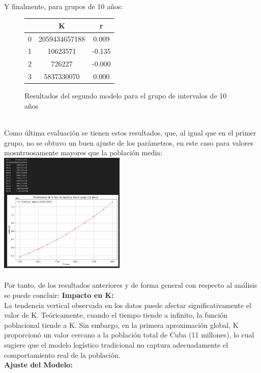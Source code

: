 \documentclass[a4paper,10pt,twocolumn]{article}
\begin{document}
\\
Y finalmente, para grupos de 10 años:\\
\begin{figure}[h!]%
	\begin{center}
		\begin{tabular}{|c|c|c|} \hline
					 & K 			& r 		\\ \hline
			0		 & 2059434657188& 0.009		\\ \hline
			1		 &10623571		& -0.135	\\ \hline
			2		 & 726227		& -0.000	\\ \hline
			3		 & 5837330070	& 0.000		\\ \hline
		\end{tabular}
	\caption{Resultados del segundo modelo para el grupo de intervalos de 10 años \label{fig:ex}}
	\end{center}
\end{figure}
\\
Como última evaluación se tienen estos resultados, que, al igual que en el primer grupo, no se obtuvo un buen ajuste de los parámetros, en este caso para valores mosntruosamente mayores que la población media:
\includegraphics[width=0.45\textwidth]{img/df10_graph.png}
\\\\
Por tanto, de los resultados anteriores y de forma general con respecto al análisis se puede concluir:
\textbf{Impacto en K: }\\
La tendencia vertical observada en los datos puede afectar significativamente el valor de K. Teóricamente, cuando el tiempo tiende a infinito, la función poblacional tiende a K. Sin embargo, en la primera aproximación global, K proporcionó un valor cercano a la población total de Cuba (11 millones), lo cual sugiere que el modelo logístico tradicional no captura adecuadamente el comportamiento real de la población.\\
\textbf{Ajuste del Modelo:}\\
\end{document}
